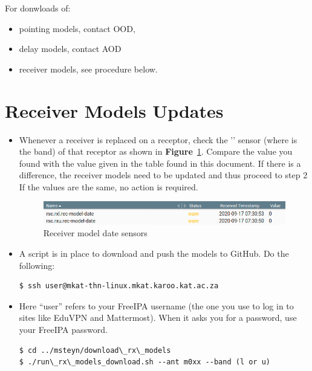 For donwloads of:
\begin{itemize}
	
\item pointing models, contact OOD,
\item delay models, contact AOD 
\item receiver models, see procedure below.
\end{itemize}
\section{ Receiver Models Updates}
\begin{itemize}
	

\item[\textbf{Step 1}] Whenever a receiver is replaced on a receptor, check the '' sensor (where  is the band) of that receptor  as shown in \textbf{Figure}~\ref{fig:image77}. Compare the value you found with the value given in the table found in this document. If there is a difference, the receiver models need to be updated and thus proceed to step 2 If the values are the same, no action is required.


\begin{figure}[!thb]
	\centering
	\includegraphics[scale=0.5]{Chapters/images/image77.png}
	
	\caption{Receiver model date sensors}
	\label{fig:image77}
\end{figure}

\item[\textbf{Step 2}] A script is in place to download and push the models to GitHub. Do the following:
\begin{lstlisting}[style=DOS]
$ ssh user@mkat-thn-linux.mkat.karoo.kat.ac.za 

\end{lstlisting}

	

\item Here “user” refers to your FreeIPA username (the one you use to log in to sites like EduVPN and Mattermost). When it asks you for a password, use your FreeIPA password.
\begin{lstlisting}[style=DOS]
$ cd ../msteyn/download\_rx\_models
$ ./run\_rx\_models_download.sh --ant m0xx --band (l or u)


\end{lstlisting}
\end{itemize}
